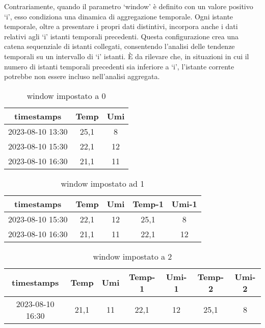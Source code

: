 \documentclass[a4paper,10pt]{article}
\begin{document}
Contrariamente, quando il parametro `window' è definito con un valore positivo `i', esso condiziona una dinamica di aggregazione temporale. 
Ogni istante temporale, oltre a presentare i propri dati distintivi, incorpora anche i dati relativi agli `i' istanti temporali precedenti. 
Questa configurazione crea una catena sequenziale di istanti collegati, consentendo l'analisi delle tendenze temporali su un intervallo di `i' istanti. 
È da rilevare che, in situazioni in cui il numero di istanti temporali precedenti sia inferiore a `i', 
l'istante corrente potrebbe non essere incluso nell'analisi aggregata.



\begin{table}[h]
  \begin{tabular}{|*{3}{c|}}
  
  \hline
  timestamps & Temp & Umi\\
  \hline
  2023-08-10 13:30 & 25,1 & 8\\
  \hline
  2023-08-10 15:30 & 22,1 & 12\\
  \hline
  2023-08-10 16:30 & 21,1 & 11\\
  \hline
  
  \end{tabular}
  
  \caption{window impostato a 0}
\end{table}


\begin{table}[h]
  \begin{tabular}{|*{5}{c|}}
  
  \hline
  timestamps & Temp & Umi & Temp-1 & Umi-1\\
  \hline
  2023-08-10 15:30 & 22,1 & 12 & 25,1 & 8\\
  \hline
  2023-08-10 16:30 & 21,1 & 11 & 22,1 & 12\\
  \hline
  
  \end{tabular}
  
  \caption{window impostato ad 1}
\end{table}


\begin{table}[h]
  \begin{tabular}{|*{7}{c|}}
  \hline
  timestamps & Temp & Umi & Temp-1 & Umi-1 & Temp-2 & Umi-2\\
  \hline
  2023-08-10 16:30 & 21,1 & 11 & 22,1 & 12 & 25,1 & 8\\
  \hline
  
  \end{tabular}
  
  \caption{window impostato a 2}
\end{table}
\end{document}
